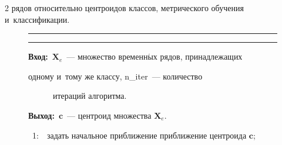 \begin{multicols}{2}
рядов относительно центроидов классов, метрического обучения и~классификации.





\renewcommand{\figurename}{\protect\bf Алгоритм}





\begin{figure}[b]


\vspace*{9pt}


\hrule





\vspace*{-4pt}





\noindent




\label{DBA_pseudo}





\vspace*{6pt}





\hrule





\vspace*{6pt}





\noindent


\textbf{Вход:}\ $\mathbf{X}_e$~--- множество временн$\acute{\mbox{ы}}$х рядов, принадлежащих 


одному и~тому же классу, n\_iter~--- количество





\ \ \ \ \ \  итераций алгоритма.





\noindent


\textbf{Выход:}\ $\mathbf{c}$~--- центроид множества $\mathbf{X}_e$.





\ 1:\ \ задать начальное приближение приближение центроида $\mathbf{c}$;






\end{figure}
\end{multicols}
